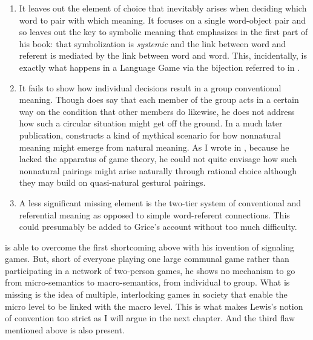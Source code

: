 \begin{enumerate}
\item It leaves out the element of choice that inevitably arises when deciding which word to pair with which meaning. It focuses on a single word-object pair and so leaves out the key to symbolic meaning that \citet{deacon:ss} emphasizes in the first part of his book: that symbolization is \emph{systemic} and the link between word and referent is mediated by the link between word and word. This, incidentally, is exactly what happens in a Language Game via the bijection referred to in .

\item It fails to show how individual decisions result in a group conventional meaning. Though \citet[127]{grice:landc} does say that each member of the group acts in a certain way on the condition that other members do likewise, he does not address how such a circular situation might get off the ground. In a much later publication, \citet[290--297]{grice:mr} constructs a kind of mythical scenario for how nonnatural meaning might emerge from natural meaning. As I wrote in , because he lacked the apparatus of game theory, he could not quite envisage how such nonnatural pairings might arise naturally through rational choice although they may build on quasi-natural gestural pairings.

\item A less significant missing element is the two-tier system of conventional and referential meaning as opposed to simple word-referent connections. This could presumably be added to Grice's account without too much difficulty.
\end{enumerate}

\citet{lewis:c} is able to overcome the first shortcoming above with his invention of signaling games. But, short of everyone playing one large communal game rather than participating in a network of two-person games, he shows no mechanism to go from micro-semantics to macro-semantics, from individual to group. What is missing is the idea of multiple, interlocking games in society that enable the micro level to be linked with the macro level. This is what makes Lewis's notion of convention too strict as I will argue in the next chapter. And the third flaw mentioned above is also present.

